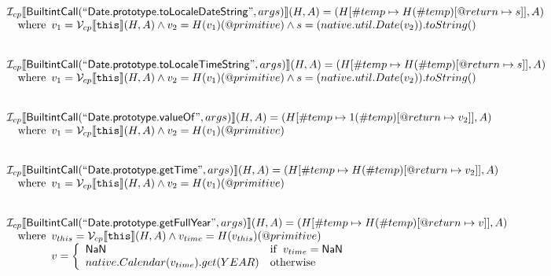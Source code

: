 \documentclass{article}
\newcommand{\SF}[1]{\mbox{\textsf{#1}}}
\newcommand{\TT}[1]{\mbox{\texttt{#1}}}
\newcommand{\wherec}[1]{{\rm where}\begin{array}[t]{l}#1\end{array}}
\newcommand{\ifc}[1]{{\rm if}\begin{array}[t]{l}#1\end{array}}
\newcommand{\owc}{{\rm otherwise}}
\newcommand{\I}{\mathcal{I}}
\newcommand{\V}{\mathcal{V}}
\newcommand{\lbr}{\llbracket}
\newcommand{\rbr}{\rrbracket}
\begin{document}
\[\begin{array}{l}
\I _{cp}\lbr \SF{BuiltintCall}(``\SF{Date.prototype.toLocaleDateString}",args)\rbr(H,A)
  = (H[\#temp \mapsto H(\#temp)[@return \mapsto s]], A)\\
\quad\wherec{
  v_1 = \V _{cp}\lbr \TT{this}\rbr (H,A) \land v_2 = H(v_1)(@primitive)
  \land s = (native.util.Date(v_2)).toString()
  }\\
\\\\


\I _{cp}\lbr \SF{BuiltintCall}(``\SF{Date.prototype.toLocaleTimeString}",args)\rbr(H,A)
  = (H[\#temp \mapsto H(\#temp)[@return \mapsto s]], A)\\
\quad\wherec{
  v_1 = \V _{cp}\lbr \TT{this}\rbr (H,A) \land v_2 = H(v_1)(@primitive)
  \land s = (native.util.Date(v_2)).toString()
  }\\
\\\\


\I _{cp}\lbr \SF{BuiltintCall}(``\SF{Date.prototype.valueOf}",args)\rbr(H,A)
  = (H[\#temp \mapsto 1(\#temp)[@return \mapsto v_2]], A)\\
\quad\wherec{
  v_1 = \V _{cp}\lbr \TT{this}\rbr (H,A) \land v_2 = H(v_1)(@primitive)
  }\\
\\\\


\I _{cp}\lbr \SF{BuiltintCall}(``\SF{Date.prototype.getTime}",args)\rbr(H,A)
  = (H[\#temp \mapsto H(\#temp)[@return \mapsto v_2]], A)\\
\quad\wherec{
  v_1 = \V _{cp}\lbr \TT{this}\rbr (H,A) \land v_2 = H(v_1)(@primitive)
  }\\
\\\\

\I _{cp}\lbr \SF{BuiltintCall}(``\SF{Date.prototype.getFullYear}",args)\rbr(H,A)
  = (H[\#temp \mapsto H(\#temp)[@return \mapsto v]], A)\\
\quad\wherec{
  v_{this} = \V _{cp}\lbr \TT{this}\rbr (H,A) \land v_{time} = H(v_{this})(@primitive)\\
  v = \left\{\begin{array}{ll}
    \SF{NaN}  & \ifc{v_{time} = \SF{NaN}}\\
    native.Calendar(v_{time}).get(YEAR) & \owc
    \end{array}\right.
  }\\
\\\\


\end{array}\]
\end{document}
